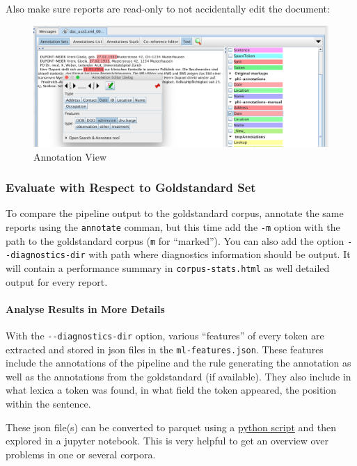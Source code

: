 Also make sure reports are read-only to not accidentally edit the
document:

\begin{figure}
\centering
\includegraphics[width=\textwidth]{figs/annotation_dialog.png}
\caption{Annotation View}
\end{figure}

\subsubsection{Evaluate with Respect to Goldstandard
Set}\label{evaluate-with-respect-to-goldstandard-set}

To compare the pipeline output to the goldstandard corpus, annotate the
same reports using the \texttt{annotate} comman, but this time add the
\texttt{-m} option with the path to the goldstandard corpus (\texttt{m}
for ``marked''). You can also add the option
\texttt{-\/-diagnostics-dir} with path where diagnostics information
should be output. It will contain a performance summary in
\texttt{corpus-stats.html} as well detailed output for every report.

\paragraph{Analyse Results in More
Details}\label{analyse-results-in-more-details}

With the \texttt{-\/-diagnostics-dir} option, various ``features'' of
every token are extracted and stored in json files in the
\texttt{ml-features.json}. These features include the annotations of the
pipeline and the rule generating the annotation as well as the
annotations from the goldstandard (if available). They also include in
what lexica a token was found, in what field the token appeared, the
position within the sentence.

These json file(s) can be converted to parquet using a
\href{https://github.com/ratschlab/medical-reports-deidentification/blob/main/scripts/convert_ml_features_to_parquet.py}{python script} and
then explored in a jupyter notebook. This is very helpful to get an
overview over problems in one or several corpora.
